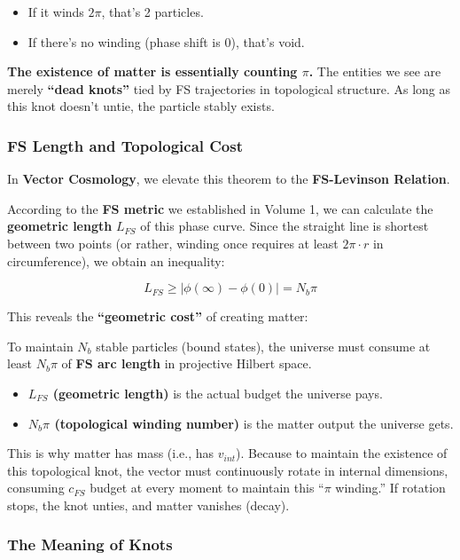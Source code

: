 \begin{itemize}
\item If it winds $2\pi$, that's 2 particles.

\item If there's no winding (phase shift is 0), that's void.
\end{itemize}

\textbf{The existence of matter is essentially counting $\pi$.} The entities we see are merely \textbf{``dead knots''} tied by FS trajectories in topological structure. As long as this knot doesn't untie, the particle stably exists.

\subsubsection{FS Length and Topological Cost}

In \textbf{Vector Cosmology}, we elevate this theorem to the \textbf{FS-Levinson Relation}.

According to the \textbf{FS metric} we established in Volume 1, we can calculate the \textbf{geometric length} $L_{FS}$ of this phase curve. Since the straight line is shortest between two points (or rather, winding once requires at least $2\pi \cdot r$ in circumference), we obtain an inequality:

\[L_{FS} \ge |\phi(\infty) - \phi(0)| = N_b \pi\]

This reveals the \textbf{``geometric cost''} of creating matter:

To maintain $N_b$ stable particles (bound states), the universe must consume at least $N_b \pi$ of \textbf{FS arc length} in projective Hilbert space.

\begin{itemize}
\item \textbf{$L_{FS}$ (geometric length)} is the actual budget the universe pays.

\item \textbf{$N_b \pi$ (topological winding number)} is the matter output the universe gets.
\end{itemize}

This is why matter has mass (i.e., has $v_{int}$). Because to maintain the existence of this topological knot, the vector must continuously rotate in internal dimensions, consuming $c_{FS}$ budget at every moment to maintain this ``$\pi$ winding.'' If rotation stops, the knot unties, and matter vanishes (decay).

\subsubsection{The Meaning of Knots}


